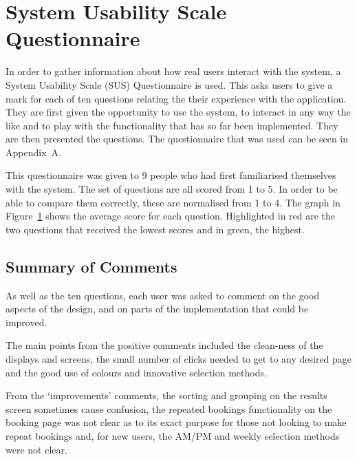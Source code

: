 \section{System Usability Scale Questionnaire}
\label{sec:system_usability_scale_questionnaire}

In order to gather information about how real users interact with the system, a
System Usability Scale (SUS) Questionnaire is used. This asks users to give a
mark for each of ten questions relating the their experience with the
application. They are first given the opportunity to use the system, to
interact in any way the like and to play with the functionality that has so far
been implemented. They are then presented the questions. The questionnaire that
was used can be seen in Appendix~A.

This questionnaire was given to 9 people who had first familiarised themselves
with the system. The set of questions are all scored from 1 to 5. In order to
be able to compare them correctly, these are normalised from 1 to 4. The graph
in Figure~\ref{fig:evalGraph} shows the average score for each question.
Highlighted in red are the two questions that received the lowest scores and in
green, the highest.

\begin{figure}[h]
\centering

\caption{}\label{fig:evalGraph}
\end{figure}

\subsection{Summary of Comments}
\label{sub:summary_of_comments}

As well as the ten questions, each user was asked to comment on the good
aspects of the design, and on parts of the implementation that could be
improved.

The main points from the positive comments included the clean-ness of the
displays and screens, the small number of clicks needed to get to any desired
page and the good use of colours and innovative selection methods.

From the `improvements' comments, the sorting and grouping on the results
screen sometimes cause confusion, the repeated bookings functionality on the
booking page was not clear as to its exact purpose for those not looking to
make repeat bookings and, for new users, the AM/PM and weekly selection methods
were not clear.
